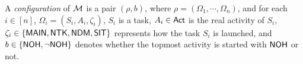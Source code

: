 A \emph{configuration} of ${\mathcal{M} }$ is a pair $(\rho, b)$, where $\rho=(\Omega_1,\cdots,\Omega_n)$, and for each $i \in [n]$, $\Omega_i = (S_i,A_i,\zeta_i)$, $S_i$ is a task, $A_i\in{\sf Act}$ is the real activity of $S_i$, $\zeta_i\in\{{\sf MAIN},{\sf NTK},{\sf NDM},{\sf SIT}\}$ represents how the task $S_i$ is launched, and $b\in\{{\sf NOH},\neg{\sf NOH}\}$ denotes whether the topmost activity is started with ${\sf NOH}$ or not.


